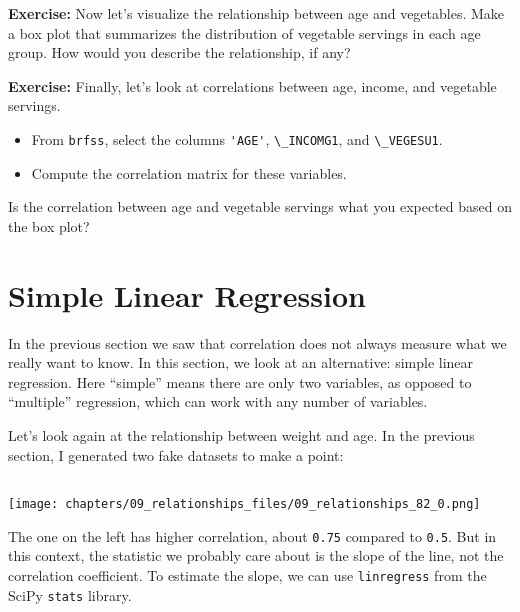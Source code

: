 \textbf{Exercise:} Now let's visualize the relationship between age and
vegetables. Make a box plot that summarizes the distribution of
vegetable servings in each age group. How would you describe the
relationship, if any?

\textbf{Exercise:} Finally, let's look at correlations between age,
income, and vegetable servings.

\begin{itemize}

\item
  From \passthrough{\lstinline!brfss!}, select the columns
  \passthrough{\lstinline!'AGE'!}, \passthrough{\lstinline!\_INCOMG1!},
  and \passthrough{\lstinline!\_VEGESU1!}.
\item
  Compute the correlation matrix for these variables.
\end{itemize}

Is the correlation between age and vegetable servings what you expected
based on the box plot?

\hypertarget{simple-linear-regression}{%
\section{Simple Linear Regression}\label{simple-linear-regression}}

In the previous section we saw that correlation does not always measure
what we really want to know. In this section, we look at an alternative:
simple linear regression. Here ``simple'' means there are only two
variables, as opposed to ``multiple'' regression, which can work with
any number of variables.

Let's look again at the relationship between weight and age. In the
previous section, I generated two fake datasets to make a point:

\begin{lstlisting}[language=Python,style=source]
\end{lstlisting}

\begin{center}
\texttt{[image: chapters/09\_relationships\_files/09\_relationships\_82\_0.png]}
\end{center}

The one on the left has higher correlation, about
\passthrough{\lstinline!0.75!} compared to
\passthrough{\lstinline!0.5!}. But in this context, the statistic we
probably care about is the slope of the line, not the correlation
coefficient. To estimate the slope, we can use
\passthrough{\lstinline!linregress!} from the SciPy
\passthrough{\lstinline!stats!} library.

